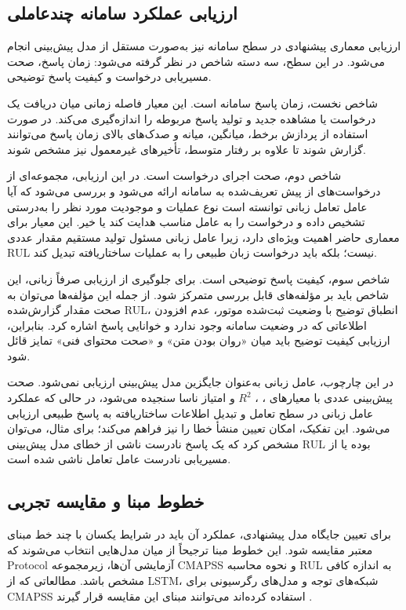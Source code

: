 \subsection{ارزیابی عملکرد سامانه چندعاملی}
\label{sec:multiagent-metrics}

ارزیابی معماری پیشنهادی در سطح سامانه نیز به‌صورت مستقل از مدل
پیش‌بینی انجام می‌شود. در این سطح، سه دسته شاخص در نظر گرفته
می‌شود: زمان پاسخ، صحت مسیریابی درخواست و کیفیت پاسخ توضیحی.

شاخص نخست، زمان پاسخ سامانه است. این معیار فاصله زمانی میان
دریافت یک درخواست یا مشاهده جدید و تولید پاسخ مربوطه را اندازه‌گیری
می‌کند. در صورت استفاده از پردازش برخط، میانگین، میانه و صدک‌های
بالای زمان پاسخ می‌توانند گزارش شوند تا علاوه بر رفتار متوسط،
تأخیرهای غیرمعمول نیز مشخص شوند.

شاخص دوم، صحت اجرای درخواست است. در این ارزیابی، مجموعه‌ای از
درخواست‌های از پیش تعریف‌شده به سامانه ارائه می‌شود و بررسی
می‌شود که آیا عامل تعامل زبانی توانسته است نوع عملیات و موجودیت
مورد نظر را به‌درستی تشخیص داده و درخواست را به عامل مناسب
هدایت کند یا خیر. این معیار برای معماری حاضر اهمیت ویژه‌ای دارد،
زیرا عامل زبانی مسئول تولید مستقیم مقدار عددی \gls{RUL} نیست؛
بلکه باید درخواست زبان طبیعی را به عملیات ساختاریافته تبدیل کند.

شاخص سوم، کیفیت پاسخ توضیحی است. برای جلوگیری از ارزیابی صرفاً
زبانی، این شاخص باید بر مؤلفه‌های قابل بررسی متمرکز شود. از جمله
این مؤلفه‌ها می‌توان به صحت مقدار گزارش‌شده \gls{RUL}، انطباق
توضیح با وضعیت ثبت‌شده موتور، عدم افزودن اطلاعاتی که در وضعیت
سامانه وجود ندارد و خوانایی پاسخ اشاره کرد. بنابراین، ارزیابی
کیفیت توضیح باید میان «روان بودن متن» و «صحت محتوای فنی» تمایز
قائل شود.

در این چارچوب، عامل زبانی به‌عنوان جایگزین مدل پیش‌بینی ارزیابی
نمی‌شود. صحت پیش‌بینی عددی با معیارهای ، ،
$R^2$ و امتیاز ناسا سنجیده می‌شود، در حالی که عملکرد عامل زبانی
در سطح تعامل و تبدیل اطلاعات ساختاریافته به پاسخ طبیعی ارزیابی
می‌شود. این تفکیک، امکان تعیین منشأ خطا را نیز فراهم می‌کند؛
برای مثال، می‌توان مشخص کرد که یک پاسخ نادرست ناشی از خطای
مدل پیش‌بینی \gls{RUL} بوده یا از مسیریابی نادرست عامل تعامل ناشی شده است.

\subsection{خطوط مبنا و مقایسه تجربی}
\label{sec:baselines}

برای تعیین جایگاه مدل پیشنهادی، عملکرد آن باید در شرایط یکسان با
چند خط مبنای معتبر مقایسه شود. این خطوط مبنا ترجیحاً از میان
مدل‌هایی انتخاب می‌شوند که \gls{Protocol} آزمایشی آن‌ها، زیرمجموعه
\gls{CMAPSS} و نحوه محاسبه \gls{RUL} به اندازه کافی مشخص باشد.
مطالعاتی که از LSTM، شبکه‌های توجه و مدل‌های رگرسیونی برای
CMAPSS استفاده کرده‌اند می‌توانند مبنای این مقایسه قرار گیرند
\cite{heimes2008recurrent,li2025attentiondt,smith2025cmapsslinear}.

